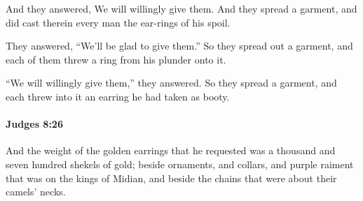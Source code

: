 			\begin{versebox}
					\item[BHS] 
					\item[ASV] And they answered, We will willingly give them. And they spread a garment, and did cast therein every man the ear-rings of his spoil.
					\item[NIV] They answered, “We’ll be glad to give them.” So they spread out a garment, and each of them threw a ring from his plunder onto it.
					\item[NRSV] “We will willingly give them,” they answered. So they spread a garment, and each threw into it an earring he had taken as booty.
			\end{versebox}

		\paragraph{Judges 8:26} %
			\label{JUDGES-8-26}

			And the weight of the golden earrings that he requested was a thousand and seven hundred shekels of gold; beside ornaments, and collars, and purple raiment that was on the kings of Midian, and beside the chains that were about their camels’ necks.


